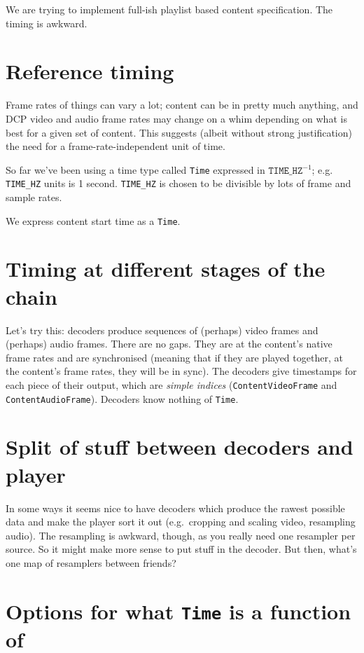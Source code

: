 \documentclass{article}
\begin{document}
We are trying to implement full-ish playlist based content specification.  The timing is awkward.

\section{Reference timing}

Frame rates of things can vary a lot; content can be in pretty much
anything, and DCP video and audio frame rates may change on a whim
depending on what is best for a given set of content.  This suggests
(albeit without strong justification) the need for a frame-rate-independent unit of time.

So far we've been using a time type called \texttt{Time} expressed in
$\mathtt{TIME\_HZ}^{-1}$; e.g. \texttt{TIME\_HZ} units is 1 second.
\texttt{TIME\_HZ} is chosen to be divisible by lots of frame and
sample rates.

We express content start time as a \texttt{Time}.


\section{Timing at different stages of the chain}

Let's try this: decoders produce sequences of (perhaps) video frames
and (perhaps) audio frames.  There are no gaps.  They are at the
content's native frame rates and are synchronised (meaning that if
they are played together, at the content's frame rates, they will be
in sync).  The decoders give timestamps for each piece of their
output, which are \emph{simple indices} (\texttt{ContentVideoFrame}
and \texttt{ContentAudioFrame}).  Decoders know nothing of \texttt{Time}.


\section{Split of stuff between decoders and player}

In some ways it seems nice to have decoders which produce the rawest
possible data and make the player sort it out (e.g.\ cropping and
scaling video, resampling audio).  The resampling is awkward, though,
as you really need one resampler per source.  So it might make more sense
to put stuff in the decoder.  But then, what's one map of resamplers between friends?


\section{Options for what \texttt{Time} is a function of}
\end{document}
